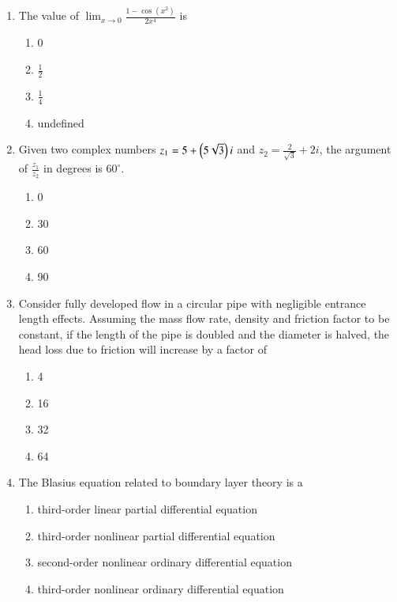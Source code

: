 \documentclass[journal,9pt,onecolumn]{IEEEtran}
\begin{document}
\begin{enumerate}

\item The value of $\lim_{{x \to 0}} \frac{1 - \cos(x^2)}{2x^4} $ is
\begin{multicols}{4}
\begin{enumerate}
    \item 0
    \item $\frac{1}{2}$
    \item $\frac{1}{4}$
    \item undefined
\end{enumerate}
\end{multicols}

\item Given two complex numbers $z_1 = 5 + \left(5\sqrt{3}\right)i$ and $z_2 = \frac{2}{\sqrt{3}} + 2i$, the argument of $\frac{z_1}{z_2}$ in degrees is $60^\circ$.

\begin{multicols}{4}
\begin{enumerate}
    \item 0
    \item 30
    \item 60
    \item 90
\end{enumerate}
\end{multicols}


\item Consider fully developed flow in a circular pipe with negligible entrance length effects. Assuming the mass flow rate, density and friction factor to be constant, if the length of the pipe is doubled and the diameter is halved, the head loss due to friction will increase by a factor of
\begin{multicols}{4}
\begin{enumerate}
    \item 4
    \item 16
    \item 32
    \item 64
\end{enumerate}
\end{multicols}

\item The Blasius equation related to boundary layer theory is a

\begin{enumerate}
    \item third-order linear partial differential equation
    \item third-order nonlinear partial differential equation
    \item second-order nonlinear ordinary differential equation
    \item third-order nonlinear ordinary differential equation
\end{enumerate}



\end{enumerate}
\end{document}
